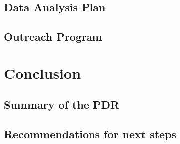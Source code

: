 \documentclass[11pt]{article}
\begin{document}
\subsection{Data Analysis Plan}

\subsection{Outreach Program}

\section{Conclusion}

\subsection{Summary of the PDR}

\subsection{Recommendations for next steps}
\end{document}
